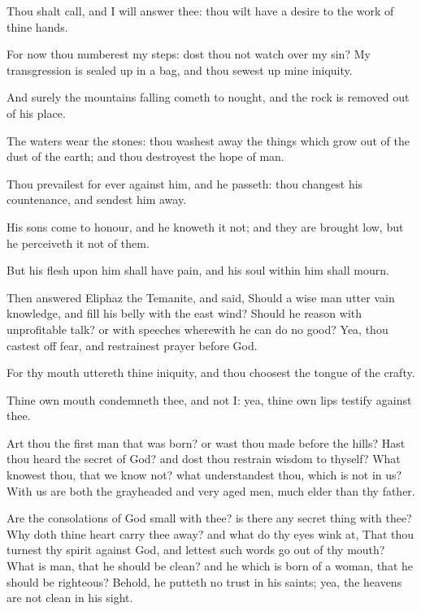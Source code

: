 \Verse Thou shalt call, and I will answer thee: thou wilt have a desire to the work of thine hands.

\Verse For now thou numberest my steps: dost thou not watch over my sin?  \Verse My transgression is sealed up in a bag, and thou sewest up mine iniquity.

\Verse And surely the mountains falling cometh to nought, and the rock is removed out of his place.

\Verse The waters wear the stones: thou washest away the things which grow out of the dust of the earth; and thou destroyest the hope of man.

\Verse Thou prevailest for ever against him, and he passeth: thou changest his countenance, and sendest him away.

\Verse His sons come to honour, and he knoweth it not; and they are brought low, but he perceiveth it not of them.

\Verse But his flesh upon him shall have pain, and his soul within him shall mourn.


\Chapter
\Verse Then answered Eliphaz the Temanite, and said, \Verse Should a wise man utter vain knowledge, and fill his belly with the east wind?  \Verse Should he reason with unprofitable talk? or with speeches wherewith he can do no good?  \Verse Yea, thou castest off fear, and restrainest prayer before God.

\Verse For thy mouth uttereth thine iniquity, and thou choosest the tongue of the crafty.

\Verse Thine own mouth condemneth thee, and not I: yea, thine own lips testify against thee.

\Verse Art thou the first man that was born? or wast thou made before the hills?  \Verse Hast thou heard the secret of God? and dost thou restrain wisdom to thyself?  \Verse What knowest thou, that we know not?  what understandest thou, which is not in us?  \Verse With us are both the grayheaded and very aged men, much elder than thy father.

\Verse Are the consolations of God small with thee? is there any secret thing with thee?  \Verse Why doth thine heart carry thee away? and what do thy eyes wink at, \Verse That thou turnest thy spirit against God, and lettest such words go out of thy mouth?  \Verse What is man, that he should be clean? and he which is born of a woman, that he should be righteous?  \Verse Behold, he putteth no trust in his saints; yea, the heavens are not clean in his sight.

